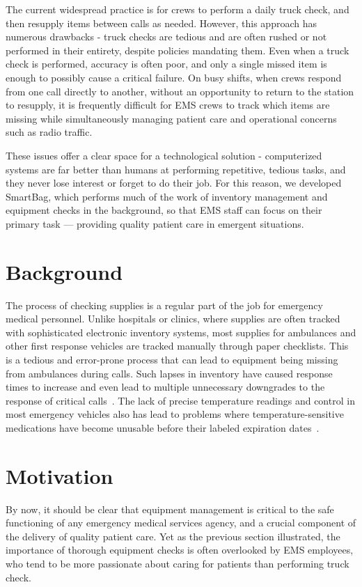 \documentclass{sigchi}
\begin{document}
The current widespread practice is for crews to perform a daily truck check,
and then resupply items between calls as needed. However, this approach
has numerous drawbacks - truck checks are tedious and are often rushed or not
performed in their entirety, despite policies mandating them. Even when a truck
check is performed, accuracy is often poor, and only a single missed item is
enough to possibly cause a critical failure. On busy shifts, when crews respond
from one call directly to another, without an opportunity to return to the station
to resupply, it is frequently difficult for EMS crews to track which items are
missing while simultaneously managing patient care and operational concerns such
as radio traffic.

These issues offer a clear space for a technological solution - computerized
systems are far better than humans at performing repetitive, tedious tasks,
and they never lose interest or forget to do their job. For this reason, we developed
SmartBag, which performs much of the work of inventory management and equipment
checks in the background, so that EMS staff can focus on their primary task ---
providing quality patient care in emergent situations.


\section{Background} \label{background}
The process of checking supplies is a regular part of the job for emergency medical
personnel. Unlike hospitals or clinics, where supplies are often tracked with
sophisticated electronic inventory systems, most supplies for ambulances and other
first response vehicles are tracked manually through paper checklists. This is a
tedious and error-prone process that can lead to equipment being missing from
ambulances during calls. Such lapses in inventory have caused response times to
increase and even lead to multiple unnecessary downgrades to the response of
critical calls~\cite{response}. The lack of precise temperature readings and control
in most emergency vehicles also has lead to problems where temperature-sensitive
medications have become unusable before their labeled expiration dates~\cite{drugs}.

\section{Motivation} \label{motivation}
By now, it should be clear that equipment management is critical to the safe
functioning of any emergency medical services agency, and a crucial component
of the delivery of quality patient care. Yet as the previous section illustrated,
the importance of thorough equipment checks is often overlooked by EMS employees,
who tend to be more passionate about caring for patients than performing truck
check.
\end{document}
